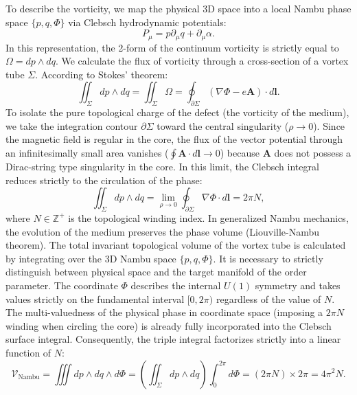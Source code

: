 \documentclass[11pt,a4paper]{article}
\begin{document}
	To describe the vorticity, we map the physical 3D space into a local Nambu phase space $\{p, q, \Phi\}$ via Clebsch hydrodynamic potentials:
	\begin{equation}
		P_\mu = p \partial_\mu q + \partial_\mu \alpha.
	\end{equation}
	In this representation, the 2-form of the continuum vorticity is strictly equal to $\Omega = dp \wedge dq$. 
	We calculate the flux of vorticity through a cross-section of a vortex tube $\Sigma$. According to Stokes' theorem:
	\begin{equation}
		\iint_\Sigma dp \wedge dq = \iint_\Sigma \Omega = \oint_{\partial \Sigma} (\nabla \Phi - e \mathbf{A}) \cdot d\mathbf{l}.
	\end{equation}
	To isolate the pure topological charge of the defect (the vorticity of the medium), we take the integration contour $\partial \Sigma$ toward the central singularity ($\rho \to 0$). Since the magnetic field is regular in the core, the flux of the vector potential through an infinitesimally small area vanishes ($\oint \mathbf{A} \cdot d\mathbf{l} \to 0$) because $\mathbf{A}$ does not possess a Dirac-string type singularity in the core. In this limit, the Clebsch integral reduces strictly to the circulation of the phase:
	\begin{equation}
		\iint_\Sigma dp \wedge dq = \lim_{\rho \to 0} \oint_{\partial \Sigma} \nabla \Phi \cdot d\mathbf{l} = 2\pi N,
	\end{equation}
	where $N \in \mathbb{Z}^+$ is the topological winding index.
	In generalized Nambu mechanics, the evolution of the medium preserves the phase volume (Liouville-Nambu theorem). The total invariant topological volume of the vortex tube is calculated by integrating over the 3D Nambu space $\{p, q, \Phi\}$. 
	It is necessary to strictly distinguish between physical space and the target manifold of the order parameter. The coordinate $\Phi$ describes the internal $U(1)$ symmetry and takes values strictly on the fundamental interval $[0, 2\pi)$ regardless of the value of $N$. The multi-valuedness of the physical phase in coordinate space (imposing a $2\pi N$ winding when circling the core) is already fully incorporated into the Clebsch surface integral. Consequently, the triple integral factorizes strictly into a linear function of $N$:
	\begin{equation}
		\mathcal{V}_{\text{Nambu}} = \iiint dp \wedge dq \wedge d\Phi = \left( \iint_\Sigma dp \wedge dq \right) \int_0^{2\pi} d\Phi = (2\pi N) \times 2\pi = 4\pi^2 N.
	\end{equation}
	
\end{document}
